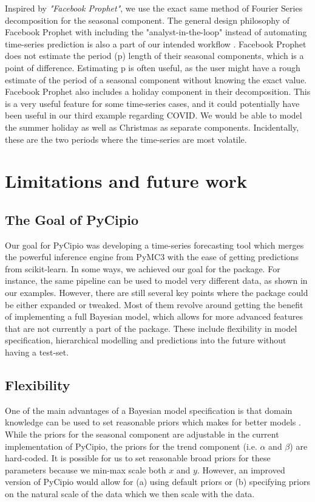 \documentclass{article}
\begin{document}
Inspired by \textit{"Facebook Prophet"}, we use the exact same method of Fourier Series decomposition for the seasonal component. The general design philosophy of Facebook Prophet with including the "analyst-in-the-loop" instead of automating time-series prediction is also a part of our intended workflow \cite{taylor2018forecasting}. 
Facebook Prophet does not estimate the period (p) length of their seasonal components, which is a point of difference. Estimating p is often useful, as the user might have a rough estimate of the period of a seasonal component without knowing the exact value. Facebook Prophet also includes a holiday component in their decomposition. This is a very useful feature for some time-series cases, and it could potentially have been useful in our third example regarding COVID. We would be able to model the summer holiday as well as Christmas as separate components. Incidentally, these are the two periods where the time-series are most volatile.


\section{Limitations and future work}

\subsection{The Goal of PyCipio}

Our goal for PyCipio was developing a time-series forecasting tool which merges the powerful inference engine from PyMC3 with the ease of getting predictions from scikit-learn. In some ways, we achieved our goal for the package. For instance, the same pipeline can be used to model very different data, as shown in our examples. However, there are still several key points where the package could be either expanded or tweaked. Most of them revolve around getting the benefit of implementing a full Bayesian model, which allows for more advanced features that are not currently a part of the package. These include flexibility in model specification, hierarchical modelling and predictions into the future without having a test-set. 


\subsection{Flexibility}

One of the main advantages of a Bayesian model specification is that domain knowledge can be used to set reasonable priors which makes for better models \cite{McElreath}. While the priors for the seasonal component are adjustable in the current implementation of PyCipio, the priors for the trend component (i.e. $\alpha$ and $\beta$) are hard-coded. It is possible for us to set reasonable broad priors for these parameters because we min-max scale both $x$ and $y$. However, an improved version of PyCipio would allow for (a) using default priors or (b) specifying priors on the natural scale of the data which we then scale with the data. 
\end{document}
